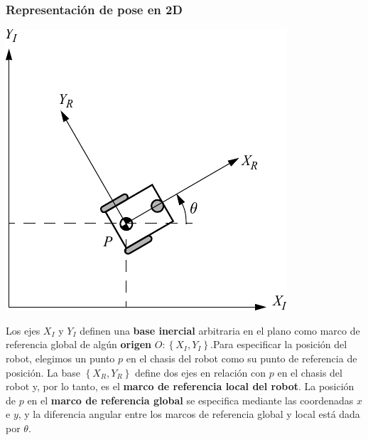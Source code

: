 \begin{frame}
    \frametitle{Representación de pose en 2D}
    \footnotesize

    \begin{center}
        \includegraphics[width=0.4\columnwidth]{./images/coordinate_systems.pdf}
    \end{center}



    Los ejes $X_I$ y $Y_I$ definen una {\bf base inercial} arbitraria en el plano como marco de referencia global de algún {\bf origen} $O:\left\lbrace X_I,Y_I \right\rbrace$.Para especificar la posición del robot, elegimos un punto $p$ en el chasis del robot como su punto de referencia de posición. La base $\left\lbrace X_R,Y_R \right\rbrace$ define dos ejes en relación con $p$ en el chasis del robot y, por lo tanto, es el {\bf marco de referencia local del robot}. La posición de $p$ en el {\bf marco de referencia global} se especifica mediante las coordenadas $x$ e $y$, y la diferencia angular entre los marcos de referencia global y local está dada por $\theta$.

\end{frame}


